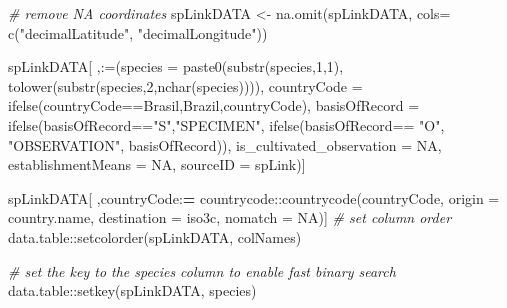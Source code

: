 \documentclass[
]{article}
\newenvironment{Shaded}{\begin{snugshade}}{\end{snugshade}}
\newcommand{\AttributeTok}[1]{\textcolor[rgb]{0.77,0.63,0.00}{#1}}
\newcommand{\CommentTok}[1]{\textcolor[rgb]{0.56,0.35,0.01}{\textit{#1}}}
\newcommand{\ConstantTok}[1]{\textcolor[rgb]{0.00,0.00,0.00}{#1}}
\newcommand{\DecValTok}[1]{\textcolor[rgb]{0.00,0.00,0.81}{#1}}
\newcommand{\ErrorTok}[1]{\textcolor[rgb]{0.64,0.00,0.00}{\textbf{#1}}}
\newcommand{\FunctionTok}[1]{\textcolor[rgb]{0.00,0.00,0.00}{#1}}
\newcommand{\NormalTok}[1]{#1}
\newcommand{\OtherTok}[1]{\textcolor[rgb]{0.56,0.35,0.01}{#1}}
\newcommand{\SpecialCharTok}[1]{\textcolor[rgb]{0.00,0.00,0.00}{#1}}
\newcommand{\StringTok}[1]{\textcolor[rgb]{0.31,0.60,0.02}{#1}}
\begin{document}
\begin{Shaded}
\begin{Highlighting}[]
\CommentTok{\# remove NA coordinates}
\NormalTok{spLinkDATA }\OtherTok{\textless{}{-}} \FunctionTok{na.omit}\NormalTok{(spLinkDATA, }\AttributeTok{cols=} \FunctionTok{c}\NormalTok{(}\StringTok{"decimalLatitude"}\NormalTok{, }\StringTok{"decimalLongitude"}\NormalTok{))}

\NormalTok{spLinkDATA[ ,}\StringTok{\textasciigrave{}}\AttributeTok{:=}\StringTok{\textasciigrave{}}\NormalTok{(}\AttributeTok{species =} \FunctionTok{paste0}\NormalTok{(}\FunctionTok{substr}\NormalTok{(species,}\DecValTok{1}\NormalTok{,}\DecValTok{1}\NormalTok{),}
                                   \FunctionTok{tolower}\NormalTok{(}\FunctionTok{substr}\NormalTok{(species,}\DecValTok{2}\NormalTok{,}\FunctionTok{nchar}\NormalTok{(species)))),}
                 \AttributeTok{countryCode =} \FunctionTok{ifelse}\NormalTok{(countryCode}\SpecialCharTok{==}\StringTok{\textquotesingle{}Brasil\textquotesingle{}}\NormalTok{,}\StringTok{\textquotesingle{}Brazil\textquotesingle{}}\NormalTok{,countryCode),}
                 \AttributeTok{basisOfRecord =} \FunctionTok{ifelse}\NormalTok{(basisOfRecord}\SpecialCharTok{==}\StringTok{"S"}\NormalTok{,}\StringTok{"SPECIMEN"}\NormalTok{,}
                                        \FunctionTok{ifelse}\NormalTok{(basisOfRecord}\SpecialCharTok{==} \StringTok{"O"}\NormalTok{,}
                                               \StringTok{"OBSERVATION"}\NormalTok{,}
\NormalTok{                                               basisOfRecord)),}
                 \AttributeTok{is\_cultivated\_observation =} \ConstantTok{NA}\NormalTok{,}
                 \AttributeTok{establishmentMeans =} \ConstantTok{NA}\NormalTok{,}
                 \AttributeTok{sourceID =} \StringTok{\textquotesingle{}spLink\textquotesingle{}}\NormalTok{)]}

\NormalTok{spLinkDATA[ ,countryCode}\SpecialCharTok{:}\ErrorTok{=}\NormalTok{ countrycode}\SpecialCharTok{::}\FunctionTok{countrycode}\NormalTok{(countryCode,}
                                                    \AttributeTok{origin =}  \StringTok{\textquotesingle{}country.name\textquotesingle{}}\NormalTok{,}
                                                    \AttributeTok{destination =} \StringTok{\textquotesingle{}iso3c\textquotesingle{}}\NormalTok{,}
                                                    \AttributeTok{nomatch =} \ConstantTok{NA}\NormalTok{)]}
\CommentTok{\# set column order}
\NormalTok{data.table}\SpecialCharTok{::}\FunctionTok{setcolorder}\NormalTok{(spLinkDATA, colNames)}

\CommentTok{\# set the key to the species column to enable fast binary search}
\NormalTok{data.table}\SpecialCharTok{::}\FunctionTok{setkey}\NormalTok{(spLinkDATA, }\StringTok{\textquotesingle{}species\textquotesingle{}}\NormalTok{)}
\end{Highlighting}
\end{Shaded}
\end{document}
